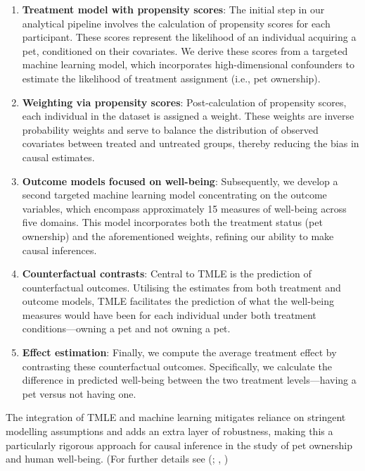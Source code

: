 \documentclass[
  singlecolumn,
  9pt]{article}
\begin{document}
\begin{enumerate}
\def\labelenumi{\arabic{enumi}.}
\item
  \textbf{Treatment model with propensity scores}: The initial step in
  our analytical pipeline involves the calculation of propensity scores
  for each participant. These scores represent the likelihood of an
  individual acquiring a pet, conditioned on their covariates. We derive
  these scores from a targeted machine learning model, which
  incorporates high-dimensional confounders to estimate the likelihood
  of treatment assignment (i.e., pet ownership).
\item
  \textbf{Weighting via propensity scores}: Post-calculation of
  propensity scores, each individual in the dataset is assigned a
  weight. These weights are inverse probability weights and serve to
  balance the distribution of observed covariates between treated and
  untreated groups, thereby reducing the bias in causal estimates.
\item
  \textbf{Outcome models focused on well-being}: Subsequently, we
  develop a second targeted machine learning model concentrating on the
  outcome variables, which encompass approximately 15 measures of
  well-being across five domains. This model incorporates both the
  treatment status (pet ownership) and the aforementioned weights,
  refining our ability to make causal inferences.
\item
  \textbf{Counterfactual contrasts}: Central to TMLE is the prediction
  of counterfactual outcomes. Utilising the estimates from both
  treatment and outcome models, TMLE facilitates the prediction of what
  the well-being measures would have been for each individual under both
  treatment conditions---owning a pet and not owning a pet.
\item
  \textbf{Effect estimation}: Finally, we compute the average treatment
  effect by contrasting these counterfactual outcomes. Specifically, we
  calculate the difference in predicted well-being between the two
  treatment levels---having a pet versus not having one.
\end{enumerate}

The integration of TMLE and machine learning mitigates reliance on
stringent modelling assumptions and adds an extra layer of robustness,
making this a particularly rigorous approach for causal inference in the
study of pet ownership and human well-being. (For further details see
(;
,
)
\end{document}
